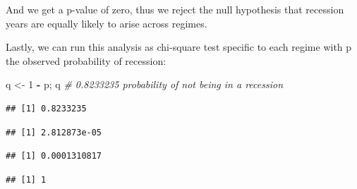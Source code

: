 \documentclass[]{article}
\newenvironment{Shaded}{\begin{snugshade}}{\end{snugshade}}
\newcommand{\CommentTok}[1]{\textcolor[rgb]{0.56,0.35,0.01}{\textit{#1}}}
\newcommand{\ControlFlowTok}[1]{\textcolor[rgb]{0.13,0.29,0.53}{\textbf{#1}}}
\newcommand{\DataTypeTok}[1]{\textcolor[rgb]{0.13,0.29,0.53}{#1}}
\newcommand{\DecValTok}[1]{\textcolor[rgb]{0.00,0.00,0.81}{#1}}
\newcommand{\KeywordTok}[1]{\textcolor[rgb]{0.13,0.29,0.53}{\textbf{#1}}}
\newcommand{\NormalTok}[1]{#1}
\newcommand{\OperatorTok}[1]{\textcolor[rgb]{0.81,0.36,0.00}{\textbf{#1}}}
\newcommand{\StringTok}[1]{\textcolor[rgb]{0.31,0.60,0.02}{#1}}
\begin{document}
And we get a p-value of zero, thus we reject the null hypothesis that
recession years are equally likely to arise across regimes.

Lastly, we can run this analysis as chi-square test specific to each
regime with p the observed probability of recession:

\begin{Shaded}
\begin{Highlighting}[]
\NormalTok{q <-}\StringTok{ }\DecValTok{1} \OperatorTok{-}\StringTok{ }\NormalTok{p; q }\CommentTok{# 0.8233235 probability of not being in a recession}
\end{Highlighting}
\end{Shaded}

\begin{verbatim}
## [1] 0.8233235
\end{verbatim}

\begin{Shaded}
\end{Shaded}

\begin{verbatim}
## [1] 2.812873e-05
\end{verbatim}

\begin{verbatim}
## [1] 0.0001310817
\end{verbatim}

\begin{verbatim}
## [1] 1
\end{verbatim}

\begin{Shaded}
\end{Shaded}
\end{document}
